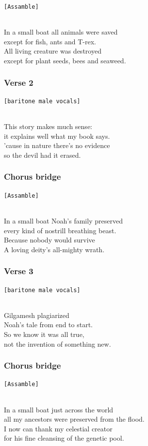 \texttt{{[}Assamble{]}}\strut \\
In a small boat all animals were saved\\
except for fish, ants and T-rex.\\
All living creature was destroyed\\
except for plant seeds, bees and seaweed.

\subsubsection{Verse 2}\label{verse-2-3}

\texttt{{[}baritone\ male\ vocals{]}}\strut \\
This story makes much sense:\\
it explains well what my book says.\\
'cause in nature there's no evidence\\
so the devil had it erased.

\subsubsection{Chorus bridge}\label{chorus-bridge-1}

\texttt{{[}Assamble{]}}\strut \\
In a small boat Noah's family preserved\\
every kind of nostrill breathing beast.\\
Because nobody would survive\\
A loving deity's all-mighty wrath.

\subsubsection{Verse 3}\label{verse-3-2}

\texttt{{[}baritone\ male\ vocals{]}}\strut \\
Gilgamesh plagiarized\\
Noah's tale from end to start.\\
So we know it was all true,\\
not the invention of something new.

\subsubsection{Chorus bridge}\label{chorus-bridge-2}

\texttt{{[}Assamble{]}}\strut \\
In a small boat just across the world\\
all my ancestors were preserved from the flood.\\
I now can thank my celestial creator\\
for his fine cleansing of the genetic pool.

